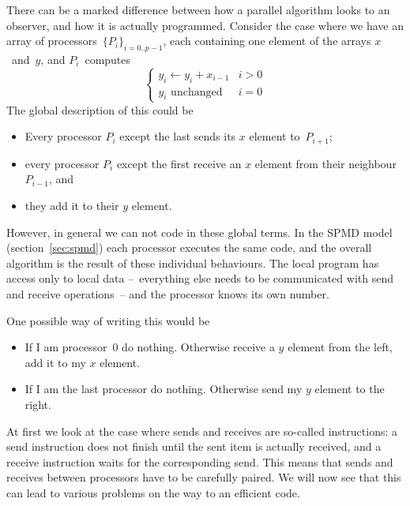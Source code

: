 
There can be a marked difference between how a parallel algorithm looks to an
observer, and how it is actually programmed.
Consider the case where we have an array of processors~$\{P_i\}_{i=0..p-1}$,
each containing one element of the arrays $x$~and~$y$, and
$P_i$~computes
\begin{equation}
\begin{cases}
y_i\leftarrow y_i+x_{i-1}&i>0\\ \mbox{$y_i$ unchanged}&i=0
\end{cases}
\label{eq:mpi-send-left}
\end{equation}
The global description of this could be
\begin{itemize}
\item Every processor $P_i$ except the last sends its $x$ element to~$P_{i+1}$;
\item every processor $P_i$ except the first receive an $x$ element from
  their neighbour~$P_{i-1}$, and
\item they add it to their $y$ element.
\end{itemize}
However, in general we can not code in these global terms.
In the \ac{SPMD} model (section~\ref{sec:spmd}) each
processor executes the same code, and the overall algorithm
is the result of  these individual behaviours. 
The local program has access only to local data --~everything else
needs to be communicated with send and receive operations~-- and the
processor knows its own number.

One possible way of writing this would be
\begin{itemize}
\item If I am processor~0 do nothing. Otherwise receive a $y$ element
  from the left, add it to my $x$ element.
\item If I am the last processor do nothing. Otherwise send my $y$
  element to the right.
\end{itemize}
At first we look at the case where sends and
receives are so-called 
instructions: a send instruction does not finish until the sent item
is actually received, and a receive instruction waits for the
corresponding send. This means that sends and receives between
processors have to be carefully paired. We will now see that this can
lead to various problems on the way to an efficient code.


